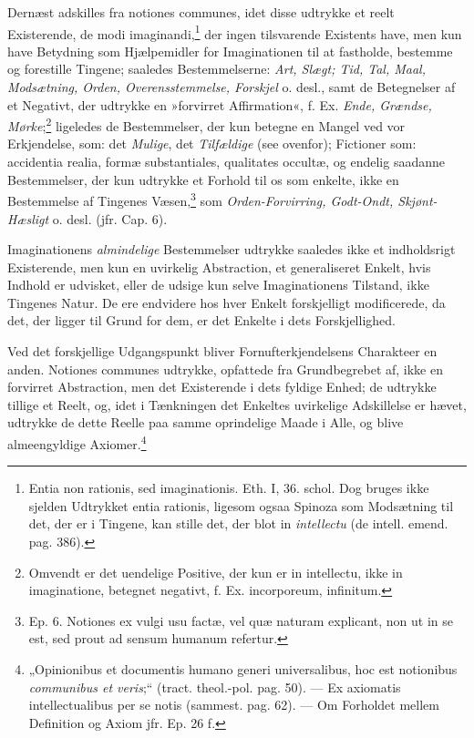 \documentclass[12pt,a4paper]{book}
\newcommand{\opage}[1]{\marginnote{\footnotesize\textit{[#1]}}}
\begin{document}
Dernæst adskilles fra notiones communes, idet disse udtrykke et
reelt Existerende, de modi imaginandi,\footnote{Entia non rationis,
sed imaginationis. Eth. I, 36. schol. Dog bruges ikke sjelden
Udtrykket entia rationis, ligesom ogsaa Spinoza som Modsætning til
det, der er i Tingene, kan stille det, der blot in \emph{intellectu}
(de intell. emend. pag. 386).} der ingen tilsvarende Existents have,
men kun have Betydning som Hjælpemidler for Imaginationen til at
fastholde, bestemme og forestille Tingene; saaledes Bestemmelserne:
\emph{Art, Slægt; Tid, Tal, Maal, Modsætning, Orden, Overensstemmelse,
Forskjel} o. desl., samt de Betegnelser af et Negativt, der udtrykke
en »forvirret Affirmation«, f. Ex. \emph{Ende, Grændse,
Mørke};\footnote{Omvendt er det uendelige Positive, der kun er in
intellectu, ikke in imaginatione, betegnet negativt, f. Ex.
incorporeum, infinitum.} ligeledes de Bestemmelser, der kun betegne
en Mangel ved vor Erkjendelse, som: det \emph{Mulige}, det \emph{Tilfældige} (see
ovenfor); Fictioner som: accidentia realia, formæ substantiales,
qualitates occultæ, og endelig saadanne Bestemmelser, der kun
udtrykke et Forhold til os som enkelte, ikke en Bestemmelse af
Tingenes Væsen,\footnote{Ep. 6. Notiones ex vulgi usu factæ, vel quæ
naturam explicant, non ut in se est, sed prout ad sensum humanum
refertur.} som \emph{Orden-Forvirring, Godt-Ondt, Skjønt-Hæsligt} o. desl.
(jfr. Cap. 6).

Imaginationens \emph{almindelige} Bestemmelser udtrykke saaledes ikke et
indholdsrigt Existerende, men kun en uvirkelig Abstraction, et
generaliseret Enkelt, hvis Indhold er udvisket, eller de udsige kun
selve Imaginationens Tilstand, ikke Tingenes Natur. De ere endvidere
hos hver Enkelt forskjelligt modificerede, da det, der ligger til
Grund for dem, er det Enkelte i dets Forskjellighed.

Ved det forskjellige Udgangspunkt bliver Fornufterkjendelsens
Charakteer en anden. Notiones communes udtrykke,
\opage{100} \setcounter{footnote}{0}%
opfattede fra Grundbegrebet af, ikke en forvirret Abstraction, men
det Existerende i dets fyldige Enhed; de udtrykke tillige et Reelt,
og, idet i Tænkningen det Enkeltes uvirkelige Adskillelse er hævet,
udtrykke de dette Reelle paa samme oprindelige Maade i Alle, og
blive almeengyldige Axiomer.\footnote{„Opinionibus et documentis
humano generi universalibus, hoc est notionibus \emph{communibus et
veris};“ (tract. theol.-pol. pag. 50). --- Ex axiomatis
intellectualibus per se notis (sammest. pag. 62). --- Om Forholdet
mellem Definition og Axiom jfr. Ep. 26 f.}
\end{document}
